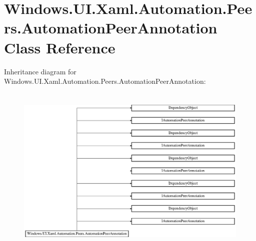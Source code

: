 \hypertarget{class_windows_1_1_u_i_1_1_xaml_1_1_automation_1_1_peers_1_1_automation_peer_annotation}{}\section{Windows.\+U\+I.\+Xaml.\+Automation.\+Peers.\+Automation\+Peer\+Annotation Class Reference}
\label{class_windows_1_1_u_i_1_1_xaml_1_1_automation_1_1_peers_1_1_automation_peer_annotation}
Inheritance diagram for Windows.\+U\+I.\+Xaml.\+Automation.\+Peers.\+Automation\+Peer\+Annotation\+:\begin{figure}[H]
\begin{center}
\leavevmode
\includegraphics[height=8.257373cm]{class_windows_1_1_u_i_1_1_xaml_1_1_automation_1_1_peers_1_1_automation_peer_annotation}
\end{center}
\end{figure}
